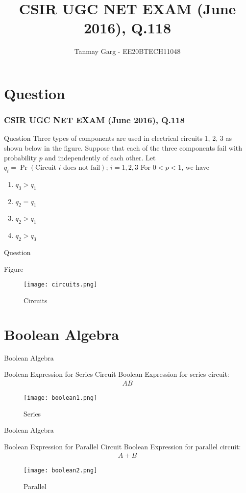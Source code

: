 \documentclass{beamer}
\title{CSIR UGC NET EXAM (June 2016), Q.118}
\author{Tanmay Garg - EE20BTECH11048}
\providecommand{\pr}[1]{\ensuremath{\Pr\left(#1\right)}}
\begin{document}
\begin{frame}
\titlepage
\end{frame}
\section{Question}
\begin{frame}
\frametitle{CSIR UGC NET EXAM (June 2016), Q.118}
\begin{block}{Question}
Three types of components are used in electrical circuits 1, 2, 3 as shown below in the figure. Suppose that each of the three components fail with probability $p$ and independently of each other.
Let $q_i = \pr{\text{Circuit $i$ does not fail}}$; $i=1,2,3$ For $0<p<1$, we have
    \begin{enumerate}
        \item $q_3>q_1$
        \item $q_2=q_1$
        \item $q_2>q_1$
        \item $q_2>q_3$
    \end{enumerate}
\end{block}
\end{frame}
\begin{frame}{Question}
\begin{block}{Figure}
\begin{figure}[h]
    \centering
    \texttt{[image: circuits.png]}
    \caption{Circuits}
    \label{fig:fig_label}
\end{figure}
\end{block}

\end{frame}
\section{Boolean Algebra}
\begin{frame}{Boolean Algebra}
\begin{block}{Boolean Expression for Series Circuit}
     Boolean Expression for series circuit:
     \begin{align}
         AB
     \end{align}
     \begin{figure}
        \centering
        \texttt{[image: boolean1.png]}
        \caption{Series}
        \label{boolean1}
    \end{figure}
\end{block}
    
\end{frame}
\begin{frame}{Boolean Algebra}
\begin{block}{Boolean Expression for Parallel Circuit}
     Boolean Expression for parallel circuit:
     \begin{align}
         A+B
     \end{align}
     \begin{figure}
        \centering
        \texttt{[image: boolean2.png]}
        \caption{Parallel}
        \label{boolean2}
    \end{figure}
\end{block}
    
\end{frame}
\end{document}
